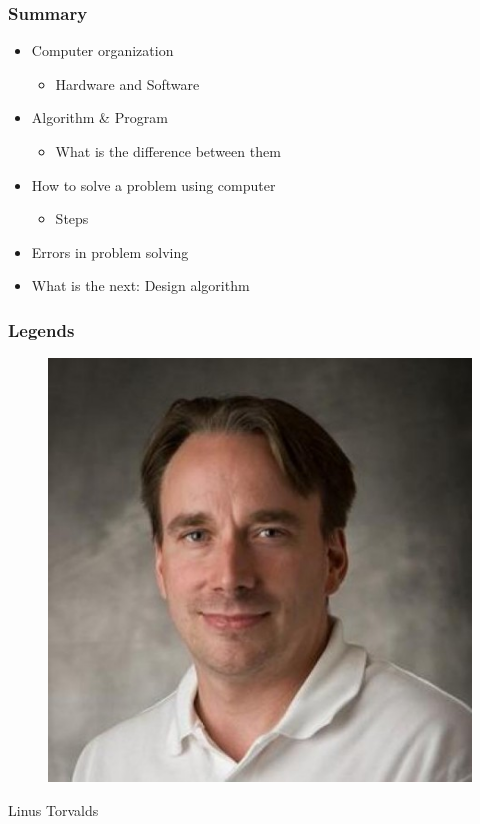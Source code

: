 \documentclass{../c-lecture}
\begin{document}
\begin{frame}
  \frametitle{Summary}
  \begin{itemize}
    \item Computer organization
    \begin{itemize}
      \item Hardware and Software
    \end{itemize}
    \pause%
    \item Algorithm \& Program
    \begin{itemize}
      \item What is the difference between them
    \end{itemize}
    \pause%
    \item How to solve a problem using computer
    \begin{itemize}
      \item Steps
    \end{itemize}
    \pause%
    \item Errors in problem solving
    \item What is the next: Design algorithm
  \end{itemize}
\end{frame}

\begin{frame}
  \frametitle{Legends}
  \begin{figure}
    \includegraphics[height=.75\textheight]{./img/torvalds.png}
  \end{figure}
  \pause%
  \centering
  \color{Violet} Linus Torvalds
\end{frame}
\end{document}
